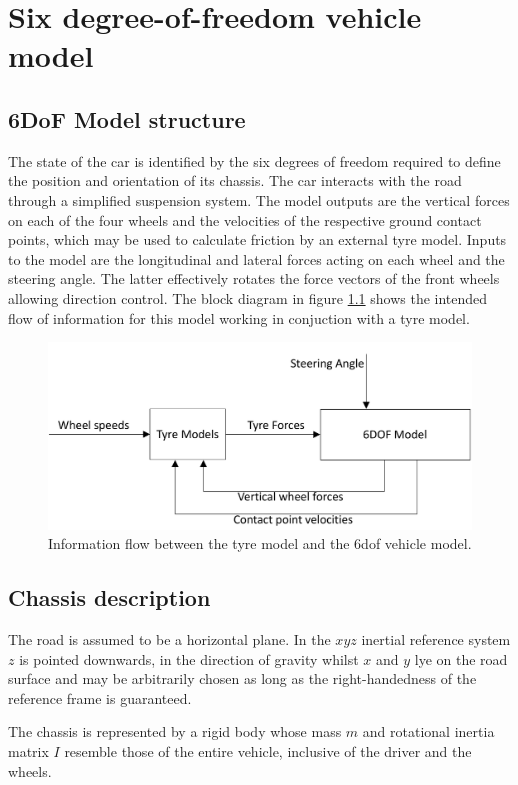 \chapter{Six degree-of-freedom vehicle model}
\label{chap:6dof}
\section{6DoF Model structure}
\label{sec:6dofconcept}
The state of the car is identified by the six degrees of freedom required to define the position and orientation of its chassis. The car interacts with the road through a simplified suspension system.
The model outputs are the vertical forces on each of the four wheels and the velocities of the respective ground contact points, which may be used to calculate friction by an external tyre model.
Inputs to the model are the longitudinal and lateral forces acting on each wheel and the steering angle. The latter effectively rotates the force vectors of the front wheels allowing direction control.
The block diagram in figure \ref{6flow} shows the intended flow of information for this model working in conjuction with a tyre model.
\begin{figure}[ht]
  \centering
  \includegraphics[width=\textwidth]{images/6flow.png}
  \caption{Information flow between the tyre model and the 6dof vehicle model.}
  \label{6flow}
\end{figure}
\section{Chassis description}
\label{sec:body}
The road is assumed to be a horizontal plane. In the $xyz$ inertial reference system $z$ is pointed downwards, in the direction of gravity whilst $x$ and $y$ lye on the road surface and may be arbitrarily chosen as long as the right-handedness of the reference frame is guaranteed.

The chassis is represented by a rigid body whose mass $m$ and rotational inertia matrix $I$ resemble those of the entire vehicle, inclusive of the driver and the wheels.

